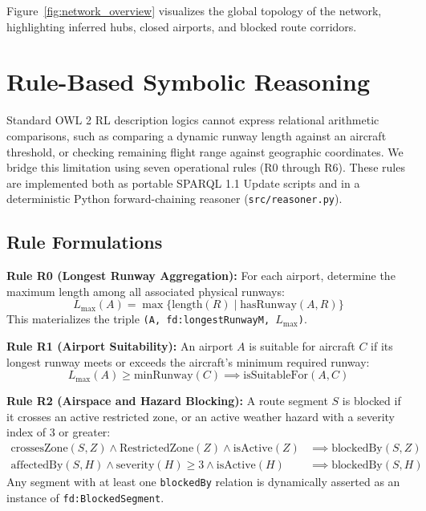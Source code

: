 \documentclass[conference]{IEEEtran}
\begin{document}
Figure~\ref{fig:network_overview} visualizes the global topology of the network, highlighting inferred hubs, closed airports, and blocked route corridors.

\section{Rule-Based Symbolic Reasoning}

Standard OWL 2 RL description logics cannot express relational arithmetic comparisons, such as comparing a dynamic runway length against an aircraft threshold, or checking remaining flight range against geographic coordinates. We bridge this limitation using seven operational rules (R0 through R6). These rules are implemented both as portable SPARQL 1.1 Update scripts and in a deterministic Python forward-chaining reasoner (\texttt{src/reasoner.py}).

\subsection{Rule Formulations}

\textbf{Rule R0 (Longest Runway Aggregation):}
For each airport, determine the maximum length among all associated physical runways:
\begin{equation}
    L_{\max}(A) = \max \{ \text{length}(R) \mid \text{hasRunway}(A, R) \}
\end{equation}
This materializes the triple \texttt{(A, fd:longestRunwayM, }$L_{\max}$\texttt{)}.

\textbf{Rule R1 (Airport Suitability):}
An airport $A$ is suitable for aircraft $C$ if its longest runway meets or exceeds the aircraft's minimum required runway:
\begin{equation}
    L_{\max}(A) \ge \text{minRunway}(C) \implies \text{isSuitableFor}(A, C)
\end{equation}

\textbf{Rule R2 (Airspace and Hazard Blocking):}
A route segment $S$ is blocked if it crosses an active restricted zone, or an active weather hazard with a severity index of 3 or greater:
\begin{align}
    \text{crossesZone}(S, Z) \land \text{RestrictedZone}(Z) \land \text{isActive}(Z) &\implies \text{blockedBy}(S, Z) \\
    \text{affectedBy}(S, H) \land \text{severity}(H) \ge 3 \land \text{isActive}(H) &\implies \text{blockedBy}(S, H)
\end{align}
Any segment with at least one \texttt{blockedBy} relation is dynamically asserted as an instance of \texttt{fd:BlockedSegment}.
\end{document}
